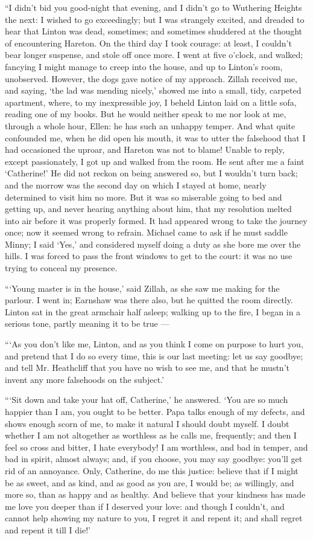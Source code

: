 \par “I didn't bid you good-night that evening, and I didn't go to Wuthering Heights the next: I wished to go exceedingly; but I was strangely excited, and dreaded to hear that Linton was dead, sometimes; and sometimes shuddered at the thought of encountering Hareton. On the third day I took courage: at least, I couldn't bear longer suspense, and stole off once more. I went at five o'clock, and walked; fancying I might manage to creep into the house, and up to Linton's room, unobserved. However, the dogs gave notice of my approach. Zillah received me, and saying, ‘the lad was mending nicely,’ showed me into a small, tidy, carpeted apartment, where, to my inexpressible joy, I beheld Linton laid on a little sofa, reading one of my books. But he would neither speak to me nor look at me, through a whole hour, Ellen: he has such an unhappy temper. And what quite confounded me, when he did open his mouth, it was to utter the falsehood that I had occasioned the uproar, and Hareton was not to blame! Unable to reply, except passionately, I got up and walked from the room. He sent after me a faint ‘Catherine!’ He did not reckon on being answered so, but I wouldn't turn back; and the morrow was the second day on which I stayed at home, nearly determined to visit him no more. But it was so miserable going to bed and getting up, and never hearing anything about him, that my resolution melted into air before it was properly formed. It had appeared wrong to take the journey once; now it seemed wrong to refrain. Michael came to ask if he must saddle Minny; I said ‘Yes,’ and considered myself doing a duty as she bore me over the hills. I was forced to pass the front windows to get to the court: it was no use trying to conceal my presence.
\par “‘Young master is in the house,’ said Zillah, as she saw me making for the parlour. I went in; Earnshaw was there also, but he quitted the room directly. Linton sat in the great armchair half asleep; walking up to the fire, I began in a serious tone, partly meaning it to be true —
\par “‘As you don't like me, Linton, and as you think I come on purpose to hurt you, and pretend that I do so every time, this is our last meeting: let us say goodbye; and tell Mr. Heathcliff that you have no wish to see me, and that he mustn't invent any more falsehoods on the subject.’
\par “‘Sit down and take your hat off, Catherine,’ he answered. ‘You are so much happier than I am, you ought to be better. Papa talks enough of my defects, and shows enough scorn of me, to make it natural I should doubt myself. I doubt whether I am not altogether as worthless as he calls me, frequently; and then I feel so cross and bitter, I hate everybody! I am worthless, and bad in temper, and bad in spirit, almost always; and, if you choose, you may say goodbye: you'll get rid of an annoyance. Only, Catherine, do me this justice: believe that if I might be as sweet, and as kind, and as good as you are, I would be; as willingly, and more so, than as happy and as healthy. And believe that your kindness has made me love you deeper than if I deserved your love: and though I couldn't, and cannot help showing my nature to you, I regret it and repent it; and shall regret and repent it till I die!’
